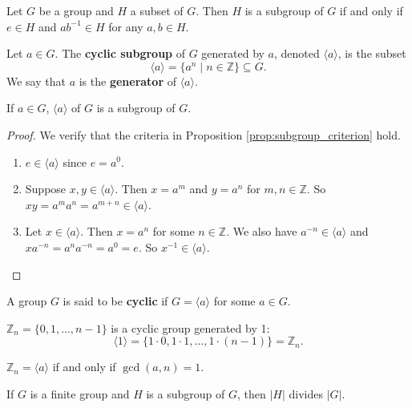 \begin{proposition}
	Let $G$ be a group and $H$ a subset of $G$. Then $H$ is a subgroup of $G$ if and only if $e\in H$ and $ab^{-1}\in H$ for any $a,b\in H$.
\end{proposition}

\begin{definition}
	Let $a\in G$. The \textbf{cyclic subgroup} of $G$ generated by $a$, denoted $\langle a\rangle$, is the subset
	$$\langle a\rangle=\{a^n\mid n\in\mathbb Z\}\subseteq G.$$
	We say that $a$ is the \textbf{generator} of $\langle a\rangle$.
\end{definition}

\begin{theorem}
	If $a\in G$, $\langle a\rangle$ of $G$ is a subgroup of $G$.
\end{theorem}

\begin{proof}
	We verify that the criteria in Proposition \ref{prop:subgroup_criterion} hold.
	\begin{enumerate}[label=\textbf{(\alph*)}]
		\item $e\in\langle a\rangle$ since $e=a^0$.
		\item Suppose $x,y\in\langle a\rangle$. Then $x=a^m$ and $y=a^n$ for $m,n\in\mathbb Z$. So $xy=a^ma^n=a^{m+n}\in\langle a\rangle$.
		\item Let $x\in\langle a\rangle$. Then $x=a^n$ for some $n\in\mathbb Z$. We also have $a^{-n}\in\langle a\rangle$ and $xa^{-n}=a^na^{-n}=a^0=e$. So $x^{-1}\in\langle a\rangle$.
	\end{enumerate}
\end{proof}

\begin{definition}
	A group $G$ is said to be \textbf{cyclic} if $G=\langle a\rangle$ for some $a\in G$.
\end{definition}

\begin{example}
	$\mathbb Z_n=\{0,1,\hdots,n-1\}$ is a cyclic group generated by 1:
	$$\langle 1\rangle=\{1\cdot 0,1\cdot 1,\hdots,1\cdot (n-1)\}=\mathbb Z_n.$$
\end{example}

\begin{theorem}
	$\mathbb Z_n=\langle a\rangle$ if and only if $\gcd(a,n)=1$.
\end{theorem}

\begin{theorem}[Lagrange]
	If $G$ is a finite group and $H$ is a subgroup of $G$, then $|H|$ divides $|G|$.
\end{theorem}

